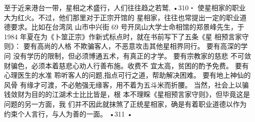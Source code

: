 至于近来港台一带，星相之术盛行，人们往往趋之若鹫,
•310・
使星相家的职业大为红火。不过，他们那里对于正宗开馆的
星相家，往往也常提出一定的职业道德要求。比如在台湾凤
山市中兴街 69 号开凤山大学士命相馆的郑景峰先生，于1984
年夏在为《卜筮正宗》作新式标点时，就在书前写下了五条《星
相预言家守则》：
要有高尚的人格
不欺骗客人，不恶意攻击其他星相界同行。
要有高深的学问
没有学历的限制，但必须博通五术，有真正的才学。
要有宗教家的慈悲
不可敛财骗色，必须本着慈悲心劝人行善布施。收费不
宜太高，贫困的酌予免费。
要有心理医生的水准
聆听客人的问题,指点可行之道，帮助解决困难。
要有地上神仙的风骨
有缘才可渡，不必勉强无缘客，用不着为五斗米而折腰。
当然，社会上以骗钱敛财为目的的江湖术士比比皆是，根
本不理睬《星相预言家守则》，但毕竟这是问题的另一方面，我
们并不因此就抹煞了正统星相家，确是有着职业道德以作为
约束个人言行，与人为善的一面。
•311 •
